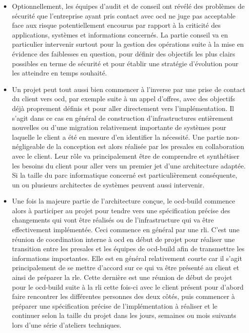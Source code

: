 \documentclass[12pt, oneside, a4paper, titlepage]{report}
\begin{document}
\begin{itemize}

    \item Optionnellement, les équipes d'audit et de conseil ont révélé des
        problèmes de sécurité que l'entreprise ayant pris contact avec \gls{ocd}
        ne juge pas acceptable face aux risque potentiellement encourus par
        rapport à la criticité des applications, systèmes et informations
        concernés. La partie conseil va en particulier intervenir surtout pour
        la gestion des opérations suite à la mise en évidence des faiblesses en
        question, pour définir des objectifs les plus clairs possibles en terme
        de sécurité et pour établir une stratégie d'évolution pour les atteindre
        en temps souhaité.

    \item Un projet peut tout aussi bien commencer à l'inverse par une prise de
        contact du client vers \gls{ocd}, par exemple suite à un appel d'offres,
        avec des objectifs déjà proprement définis et pour aller directement
        vers l'implémentation. Il s'agit dans ce cas en général de construction
        d'infrastructures entièrement nouvelles ou d'une migration relativement
        importante de systèmes pour laquelle le client a été en mesure d'en
        identifier la nécessité. Une partie non-négligeable de la conception est
        alors réalisée par les \gls{presales} en collaboration avec le client.
        Leur rôle va principalement être de comprendre et synthétiser les
        besoins du client pour aller vers un premier jet d'une architecture
        adaptée. Si la taille du parc informatique concerné est particulièrement
        conséquente, un ou plusieurs architectes de systèmes peuvent aussi
        intervenir.

    \item Une fois la majeure partie de l'architecture conçue, le
        \gls{ocd-build} commence alors à participer au projet pour tendre vers
        une spécification précise des changements qui vont être réalisés ou de
        l'infrastructure qui va être effectivement implémentée. Ceci commence en
        général par une \gls{rli}. C'est une réunion de coordination interne à
        \gls{ocd} en début de projet pour réaliser une transition entre les
        \gls{presales} et les équipes de \gls{ocd-build} afin de transmettre les
        informations importantes. Elle est en général relativement courte car il
        s'agit principalement de se mettre d'accord sur ce qui va être présenté
        au client et ainsi de préparer la \gls{rle}. Cette dernière est une
        réunion de début de projet pour le \gls{ocd-build} suite à la \gls{rli}
        cette fois-ci avec le client présent pour d'abord faire rencontrer les
        différentes personnes des deux côtés, puis commencer à préparer une
        spécification précise de l'implémentation à réaliser et le continuer
        selon la taille du projet dans les jours, semaines ou mois suivants lors
        d'une série d'ateliers techniques.


\end{itemize}
\end{document}
